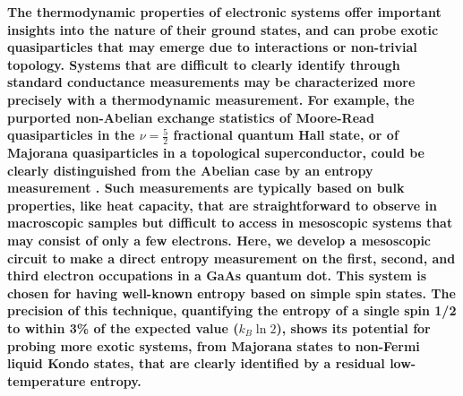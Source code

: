 \documentclass[twocolumn,showpacs,amsmath,amssymb,prl,aps,superscriptaddress]{revtex4-1}
\begin{document}
\textbf{The thermodynamic properties of electronic systems offer important insights into the nature of their ground states, and can probe exotic quasiparticles that may emerge due to interactions or non-trivial topology.  Systems that are difficult to clearly identify through standard conductance measurements may be characterized more precisely with a thermodynamic measurement. For example, the purported non-Abelian exchange statistics of Moore-Read quasiparticles in the $\nu = \frac{5}{2}$ fractional quantum Hall state, or of Majorana quasiparticles in a topological superconductor, could be clearly distinguished from the Abelian case by an entropy measurement \cite{Cooper2009, Smirnov2015}.  Such measurements are typically based on bulk properties, like heat capacity, that are straightforward to observe in macroscopic samples but difficult to access in mesoscopic systems that may consist of only a few electrons.  Here, we develop a mesoscopic circuit to make a direct entropy measurement on the first, second, and third electron occupations in a GaAs quantum dot.  This system is chosen for having well-known entropy based on simple spin states\cite{Tarucha1996, Ciorga2000, Duncan2000, Lindemann2002, Potok2003, Hofmann2016}.  The precision of this technique, quantifying the entropy of a single spin 1/2 to within 3\% of the expected value ($k_B\ln{2}$), shows its potential for probing more exotic systems, from Majorana states to non-Fermi liquid Kondo states, that are clearly identified by a residual low-temperature entropy\cite{Alkurtass2016}.}
\end{document}
